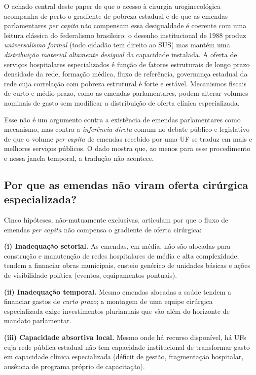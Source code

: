 \documentclass[12pt,a4paper,oneside]{article}
\begin{document}
O achado central deste paper \textemdash{} de que o acesso à
cirurgia uroginecológica acompanha de perto o gradiente de
pobreza estadual e de que as emendas parlamentares
\textit{per capita} não compensam essa desigualdade
\textemdash{} é coerente com uma leitura clássica do federalismo
brasileiro: o desenho institucional de 1988 produz
\textit{universalismo formal} (todo cidadão tem direito ao SUS)
mas mantém uma \textit{distribuição material altamente desigual}
da capacidade instalada. A oferta de serviços hospitalares
especializados é função de fatores estruturais de longo prazo
\textemdash{} densidade da rede, formação médica, fluxo de
referência, governança estadual da rede \textemdash{} cuja
correlação com pobreza estrutural é forte e estável. Mecanismos
fiscais de curto e médio prazo, como as emendas parlamentares,
podem alterar volumes nominais de gasto sem modificar a
distribuição de oferta clínica especializada.

Esse não é um argumento contra a existência de emendas
parlamentares como mecanismo, mas contra a \textit{inferência
direta} \textemdash{} comum no debate público e legislativo
\textemdash{} de que o volume \textit{per capita} de emendas
recebido por uma UF se traduz em mais e melhores serviços
públicos. O dado mostra que, ao menos para esse procedimento e
nessa janela temporal, a tradução não acontece.

\subsection{Por que as emendas não viram oferta cirúrgica
especializada?}

Cinco hipóteses, não-mutuamente exclusivas, articulam por que o
fluxo de emendas \textit{per capita} não compensa o gradiente
de oferta cirúrgica:

\textbf{(i) Inadequação setorial.} As emendas, em média, não
são alocadas para construção e manutenção de redes hospitalares
de média e alta complexidade; tendem a financiar obras
municipais, custeio genérico de unidades básicas e ações de
visibilidade política (eventos, equipamentos pontuais).

\textbf{(ii) Inadequação temporal.} Mesmo emendas alocadas a
saúde tendem a financiar gastos de \textit{curto prazo}; a
montagem de uma equipe cirúrgica especializada exige
investimentos plurianuais que vão além do horizonte de mandato
parlamentar.

\textbf{(iii) Capacidade absortiva local.} Mesmo onde há
recurso disponível, há UFs cuja rede pública estadual não tem
capacidade institucional de transformar gasto em capacidade
clínica especializada (déficit de gestão, fragmentação
hospitalar, ausência de programa próprio de capacitação).
\end{document}
